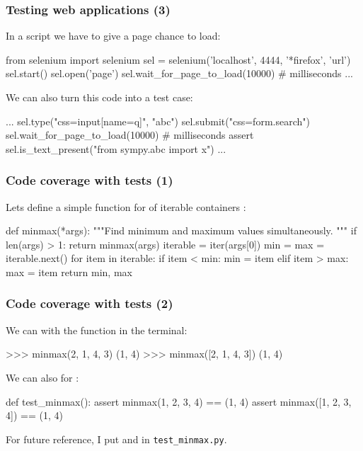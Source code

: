 \documentclass{beamer}
\begin{document}
\begin{frame}[fragile]
    \frametitle{Testing web applications (3)}

In a script we have to give a page chance to load:
    \begin{python}
from selenium import selenium
sel = selenium('localhost', 4444, '*firefox', 'url')
sel.start()
sel.open('page')
sel.wait_for_page_to_load(10000) # milliseconds
...
    \end{python}
\pause
We can also turn this code into a test case:
    \begin{python}
...
sel.type("css=input[name=q]", "abc")
sel.submit("css=form.search")
sel.wait_for_page_to_load(10000) # milliseconds
assert sel.is_text_present("from sympy.abc import x")
...
    \end{python}
\end{frame}

\begin{frame}[fragile]
    \frametitle{Code coverage with tests (1)}

    Lets define a simple function for  of iterable containers :
    \begin{python}
def minmax(*args):
    """Find minimum and maximum values simultaneously. """
    if len(args) > 1:
        return minmax(args)
    iterable = iter(args[0])
    min = max = iterable.next()
    for item in iterable:
        if item < min:
            min = item
        elif item > max:
            max = item
    return min, max
    \end{python}
\end{frame}

\begin{frame}[fragile]
    \frametitle{Code coverage with tests (2)}

    We can  with the function in the terminal:
    \begin{python}
 >>> minmax(2, 1, 4, 3)
(1, 4)
 >>> minmax([2, 1, 4, 3])
(1, 4)
    \end{python}
    \pause
    We can also  for :
    \begin{python}
def test_minmax():
    assert minmax(1, 2, 3, 4) == (1, 4)
    assert minmax([1, 2, 3, 4]) == (1, 4)
    \end{python}
    \pause
    For future reference, I put  and 
    in \verb+test_minmax.py+.
\end{frame}
\end{document}
